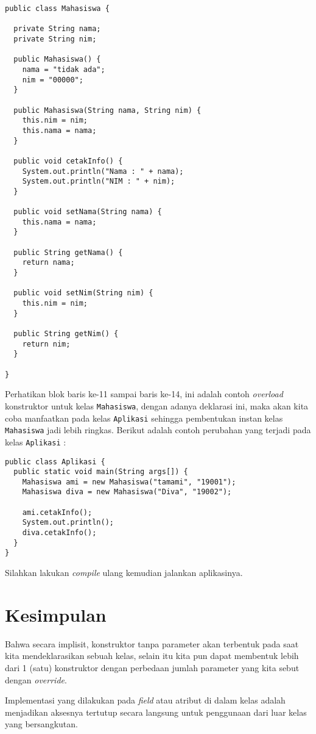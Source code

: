 \begin{lstlisting}
public class Mahasiswa {

  private String nama;
  private String nim;
  
  public Mahasiswa() {
    nama = "tidak ada";
    nim = "00000";
  }
  
  public Mahasiswa(String nama, String nim) {
    this.nim = nim;
    this.nama = nama;
  }
  
  public void cetakInfo() {
    System.out.println("Nama : " + nama);
    System.out.println("NIM : " + nim);
  }
  
  public void setNama(String nama) {
    this.nama = nama;
  }
  
  public String getNama() {
    return nama;
  }
  
  public void setNim(String nim) {
    this.nim = nim;
  }
  
  public String getNim() {
    return nim;
  }

}
\end{lstlisting}

Perhatikan blok baris ke-11 sampai baris ke-14, ini adalah contoh \textit{overload} konstruktor untuk kelas \texttt{Mahasiswa}, dengan adanya deklarasi ini, maka akan kita coba manfaatkan pada kelas \texttt{Aplikasi} sehingga pembentukan instan kelas \texttt{Mahasiswa} jadi lebih ringkas. Berikut adalah contoh perubahan yang terjadi pada kelas \texttt{Aplikasi} :

\begin{lstlisting}
public class Aplikasi {
  public static void main(String args[]) {
    Mahasiswa ami = new Mahasiswa("tamami", "19001");
    Mahasiswa diva = new Mahasiswa("Diva", "19002");
    
    ami.cetakInfo();
    System.out.println();
    diva.cetakInfo();
  }
}
\end{lstlisting}

Silahkan lakukan \textit{compile} ulang kemudian jalankan aplikasinya.

\section{Kesimpulan}

Bahwa secara implisit, konstruktor tanpa parameter akan terbentuk pada saat kita mendeklarasikan sebuah kelas, selain itu kita pun dapat membentuk lebih dari 1 (satu) konstruktor dengan perbedaan jumlah parameter yang kita sebut dengan \textit{override}.

Implementasi yang dilakukan pada \textit{field} atau atribut di dalam kelas adalah menjadikan aksesnya tertutup secara langsung untuk penggunaan dari luar kelas yang bersangkutan.

